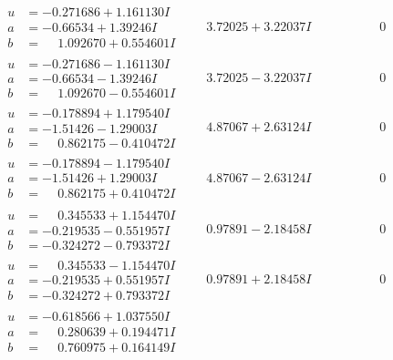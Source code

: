 \documentclass[1p]{elsarticle_modified}
\theoremstyle{definition}
\begin{document}
$$\begin{array}{c|c|c}
\begin{aligned}
u &= -0.271686 + 1.161130 I \\
a &= -0.66534 + 1.39246 I \\
b &= \phantom{-}1.092670 + 0.554601 I\end{aligned}
 & \phantom{-}3.72025 + 3.22037 I & \phantom{-0.000000 } 0 \\ \hline\begin{aligned}
u &= -0.271686 - 1.161130 I \\
a &= -0.66534 - 1.39246 I \\
b &= \phantom{-}1.092670 - 0.554601 I\end{aligned}
 & \phantom{-}3.72025 - 3.22037 I & \phantom{-0.000000 } 0 \\ \hline\begin{aligned}
u &= -0.178894 + 1.179540 I \\
a &= -1.51426 - 1.29003 I \\
b &= \phantom{-}0.862175 - 0.410472 I\end{aligned}
 & \phantom{-}4.87067 + 2.63124 I & \phantom{-0.000000 } 0 \\ \hline\begin{aligned}
u &= -0.178894 - 1.179540 I \\
a &= -1.51426 + 1.29003 I \\
b &= \phantom{-}0.862175 + 0.410472 I\end{aligned}
 & \phantom{-}4.87067 - 2.63124 I & \phantom{-0.000000 } 0 \\ \hline\begin{aligned}
u &= \phantom{-}0.345533 + 1.154470 I \\
a &= -0.219535 - 0.551957 I \\
b &= -0.324272 - 0.793372 I\end{aligned}
 & \phantom{-}0.97891 - 2.18458 I & \phantom{-0.000000 } 0 \\ \hline\begin{aligned}
u &= \phantom{-}0.345533 - 1.154470 I \\
a &= -0.219535 + 0.551957 I \\
b &= -0.324272 + 0.793372 I\end{aligned}
 & \phantom{-}0.97891 + 2.18458 I & \phantom{-0.000000 } 0 \\ \hline\begin{aligned}
u &= -0.618566 + 1.037550 I \\
a &= \phantom{-}0.280639 + 0.194471 I \\
b &= \phantom{-}0.760975 + 0.164149 I\end{aligned}

\end{array}$$
\end{document}
